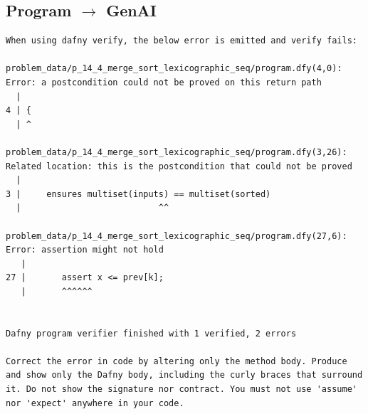\documentclass{article}
\begin{document}
\subsection*{Program $\rightarrow$ GenAI}
\begin{lstlisting}
When using dafny verify, the below error is emitted and verify fails:

problem_data/p_14_4_merge_sort_lexicographic_seq/program.dfy(4,0): Error: a postcondition could not be proved on this return path
  |
4 | {
  | ^

problem_data/p_14_4_merge_sort_lexicographic_seq/program.dfy(3,26): Related location: this is the postcondition that could not be proved
  |
3 | 	ensures multiset(inputs) == multiset(sorted)
  |                           ^^

problem_data/p_14_4_merge_sort_lexicographic_seq/program.dfy(27,6): Error: assertion might not hold
   |
27 |       assert x <= prev[k];
   |       ^^^^^^


Dafny program verifier finished with 1 verified, 2 errors

Correct the error in code by altering only the method body. Produce and show only the Dafny body, including the curly braces that surround it. Do not show the signature nor contract. You must not use 'assume' nor 'expect' anywhere in your code.
\end{lstlisting}
\end{document}
